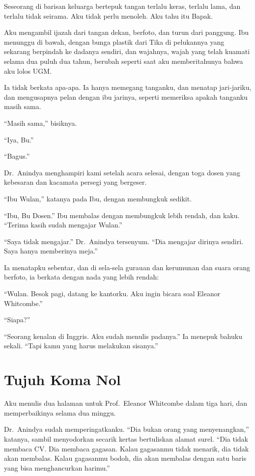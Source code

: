 \documentclass[11pt,twoside,openany]{book}
\begin{document}
Seseorang di barisan keluarga bertepuk tangan terlalu keras, terlalu lama, dan terlalu tidak seirama. Aku tidak perlu menoleh. Aku tahu itu Bapak.

Aku mengambil ijazah dari tangan dekan, berfoto, dan turun dari panggung. Ibu menunggu di bawah, dengan bunga plastik dari Tika di pelukannya yang sekarang berpindah ke dadanya sendiri, dan wajahnya, wajah yang telah kuamati selama dua puluh dua tahun, berubah seperti saat aku memberitahunya bahwa aku lolos UGM.

Ia tidak berkata apa-apa. Ia hanya memegang tanganku, dan menatap jari-jariku, dan mengusapnya pelan dengan ibu jarinya, seperti memeriksa apakah tanganku masih sama.

``Masih sama,'' bisiknya.

``Iya, Bu.''

``Bagus.''

Dr.~Anindya menghampiri kami setelah acara selesai, dengan toga dosen yang kebesaran dan kacamata persegi yang bergeser.

``Ibu Wulan,'' katanya pada Ibu, dengan membungkuk sedikit.

``Ibu, Bu Dosen.'' Ibu membalas dengan membungkuk lebih rendah, dan kaku. ``Terima kasih sudah mengajar Wulan.''

``Saya tidak mengajar.'' Dr.~Anindya tersenyum. ``Dia mengajar dirinya sendiri. Saya hanya memberinya meja.''

Ia menatapku sebentar, dan di sela-sela gurauan dan kerumunan dan suara orang berfoto, ia berkata dengan nada yang lebih rendah:

``Wulan. Besok pagi, datang ke kantorku. Aku ingin bicara soal Eleanor Whitcombe.''

``Siapa?''

``Seorang kenalan di Inggris. Aku sudah menulis padanya.'' Ia menepuk bahuku sekali. ``Tapi kamu yang harus melakukan sisanya.''

\chapter{Tujuh Koma Nol}
Aku menulis dua halaman untuk Prof.~Eleanor Whitcombe dalam tiga hari, dan memperbaikinya selama dua minggu.

Dr.~Anindya sudah memperingatkanku. ``Dia bukan orang yang menyenangkan,'' katanya, sambil menyodorkan secarik kertas bertuliskan alamat surel. ``Dia tidak membaca CV. Dia membaca gagasan. Kalau gagasanmu tidak menarik, dia tidak akan membalas. Kalau gagasanmu bodoh, dia akan membalas dengan satu baris yang bisa menghancurkan harimu.''
\end{document}
